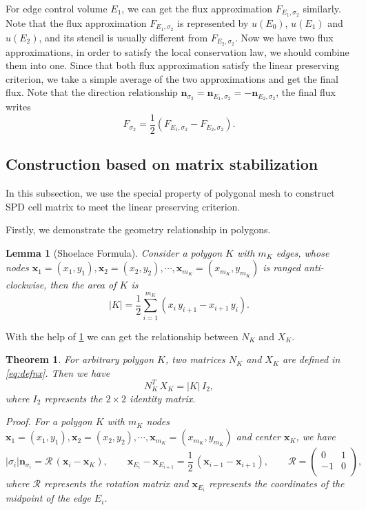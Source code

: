 \documentclass[times,review,preprint]{elsarticle}
\newtheorem{theorem}{Theorem}
\newtheorem{lemma}{Lemma}
\newcommand{\bx}{\bm{x}}
\newcommand{\bn}{\bm{n}}
\begin{document}
For edge control volume $E_{1}$, we can get the flux approximation $F_{E_{1}, \sigma_{2}}$ similarly. Note that the flux approximation $F_{E_{1}, \sigma_{2}}$ is represented by $u(E_{0})$, $u(E_{1})$ and $u(E_{2})$, and its stencil is usually different from $F_{E_{2}, \sigma_{2}}$. Now we have two flux approximations, in order to satisfy the local conservation law, we should combine them into one. Since that both flux approximation satisfy the linear preserving criterion, we take a simple average of the two approximations and get the final flux. Note that the direction relationship $\bn_{\sigma_{2}} = \bn_{E_{1}, \sigma_{2}} = - \bn_{E_{2}, \sigma_{2}}$, the final flux writes
\begin{equation*}
F_{\sigma_{2}} = \frac12 (F_{E_{1}, \sigma_{2}} - F_{E_{2}, \sigma_{2}}).
\end{equation*}

\subsection{Construction based on matrix stabilization}

In this subsection, we use the special property of polygonal mesh to construct SPD cell matrix to meet the linear preserving criterion.

Firstly, we demonstrate the geometry relationship in polygons.
\begin{lemma}[Shoelace Formula]\label{lemma:K}
Consider a polygon $K$ with $m_K$ edges, whose nodes $\bx_1 = (x_1, y_1), \bx_2 = (x_2, y_2), \cdots, \bx_{m_K} = (x_{m_K}, y_{m_K})$ is ranged anti-clockwise, then the area of $K$ is
\begin{equation}
|K| = \frac12 \sum_{i=1}^{m_K} (x_{i} \, y_{i+1} - x_{i+1} \, y_{i}).
\end{equation}
\end{lemma}

With the help of \cref{lemma:K} we can get the relationship between $N_K$ and $X_K$.
\begin{theorem}\label{thm:zhongyao}
For arbitrary polygon $K$, two matrices $N_K$ and $X_K$ are defined in \cref{eq:defnx}. Then we have
\begin{equation}\label{eq:nx}
N_K^T \, X_K = |K| \, I_2,
\end{equation}
where $I_2$ represents the $2 \times 2$ identity matrix.
\end{theorem}

\em{Proof.} For a polygon $K$ with $m_K$ nodes $\bx_1 = (x_1, y_1), \bx_2 = (x_2, y_2), \cdots, \bx_{m_K} = (x_{m_K}, y_{m_K})$ and center $\bx_K$, we have
\begin{equation*}
|\sigma_{i}| \bn_{\sigma_{i}} = \mathcal{R} \, (\bx_{i} - \bx_K), \qquad
\bx_{E_{i}} - \bx_{E_{i+1}} = \frac12 \, (\bx_{i-1} - \bx_{i+1}), \qquad
\mathcal{R} = \left(\begin{matrix}
0 & 1 \\
-1 & 0 \\
\end{matrix}\right),
\end{equation*}
where $\mathcal{R}$ represents the rotation matrix and $\bx_{E_i}$ represents the coordinates of the midpoint of the edge $E_i$.
\end{document}
